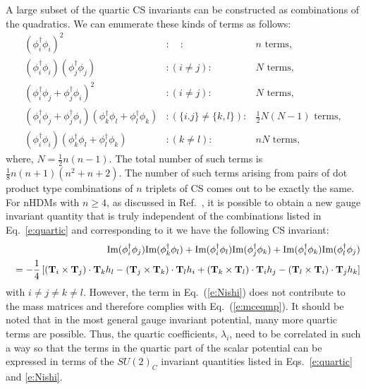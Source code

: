 \documentclass[11pt]{article}
\def\Eqn#1{Eq.\ (\ref{#1})}
\begin{document}
%
A large subset of the quartic CS invariants can be constructed as combinations of the quadratics. We
can enumerate these kinds of terms as follows: 
\begin{subequations}
	\label{e:quartic}
	\begin{eqnarray}
	(\phi_i^\dagger \phi_i)^2 & : \quad : & \mbox{$n$ terms}, \\
	(\phi_i^\dagger \phi_i)(\phi_j^\dagger \phi_j) & : (i\neq j) : &
	\mbox{$N$ terms}, \\ 
	(\phi_i^\dagger \phi_j + \phi_j^\dagger \phi_i)^2
	& : (i\neq j) : & \mbox{$N$ terms}, \\
	(\phi_i^\dagger \phi_j + \phi_j^\dagger \phi_i)(\phi_k^\dagger
	\phi_l + \phi_l^\dagger \phi_k) & : (\{i.j\} \neq \{k,l\})  : &
	\mbox{$\frac12N(N-1)$ terms}, \\ 
	(\phi_i^\dagger \phi_i)(\phi_k^\dagger
	\phi_l + \phi_l^\dagger \phi_k) & : (k\neq l) : & \mbox{$nN$ terms},
	\end{eqnarray}
\end{subequations}
where, $N=\frac12n(n-1)$. The total number of such terms is $ \frac18n(n+1)(n^2+n+2)$.  
The number of such terms arising from pairs of dot product type combinations of $n$ triplets of CS comes out to be exactly the same.  
For nHDMs with $n\ge4$, as discussed in Ref.~\cite{Nishi:2011gc}, it is possible to obtain a new gauge invariant quantity that is truly independent of the combinations listed in Eq.~\eqref{e:quartic} and corresponding to it we have the following CS invariant:
%
\begin{eqnarray}\nonumber
	&&\text{Im}(\phi_i^\dagger\phi_j)\text{Im}(\phi_k^\dagger\phi_l)+\text{Im}(\phi_i^\dagger\phi_l)\text{Im}(\phi_j^\dagger\phi_k)+\text{Im}(\phi_i^\dagger\phi_k)\text{Im}(\phi_l^\dagger\phi_j)\\&&=-\frac{1}{4}\left[({\bf T}_i \times {\bf T}_j)\cdot {\bf T}_k h_l -({\bf T}_j \times {\bf T}_k)\cdot {\bf T}_l h_i+({\bf T}_k \times {\bf T}_l)\cdot {\bf T}_i h_j-({\bf T}_l \times {\bf T}_i)\cdot {\bf T}_j h_k \right] 	\label{e:Nishi}
\end{eqnarray}
%
with $i\ne j\ne k \ne l$. However, the term in \Eqn{e:Nishi} does
	not contribute to the mass matrices and therefore complies with \Eqn{e:mceqmp}.
It should be noted that in the most general gauge invariant
potential, many more quartic terms are possible.  Thus,  
the quartic coefficients, $\lambda_i$, need to be correlated in such a way so that the terms in the quartic part of the scalar potential can be expressed in terms of the $SU(2)_C$ invariant quantities listed in Eqs.~\eqref{e:quartic} and \eqref{e:Nishi}.  
\end{document}
